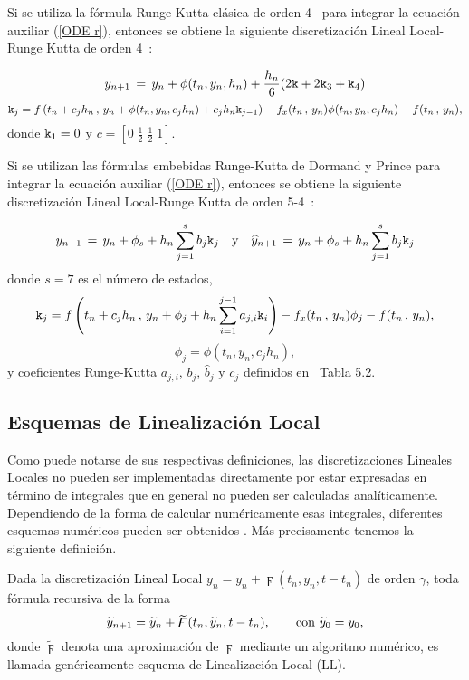 Si se utiliza la fórmula Runge-Kutta clásica de orden 4~\cite{hairer1993solving} para integrar la ecuación auxiliar (\ref{ODE r}), entonces se obtiene la siguiente discretización Lineal Local-Runge Kutta de orden 4~\cite{Jimenez13}:

\begin{equation}
    y_{n+1}\,=\,y_n+\phi(t_n,y_n,h_n)+\frac{h_n}{6}(2\mathtt{k}+2\mathtt{k}_3+\mathtt{k}_4)
    \label{LL-scheme-4}
    \end{equation}
    \[ \mathtt{k}_j = f\left( t_n+c_jh_n\, , \, y_n+\phi(t_n,y_n,c_jh_n)+c_jh_n\mathtt{k}_{j-1} \right)
- f_x(t_n\, , \, y_n)\phi(t_n,y_n,c_jh_n) - f(t_n\, ,\, y_n) ,\]
donde $\mathtt{k}_1=0$ y $c = \left[ 0 \; \frac{1}{2} \; \frac{1}{2} \; 1  \right]$.

Si se utilizan las fórmulas embebidas Runge-Kutta de Dormand y Prince para integrar la ecuación auxiliar (\ref{ODE r}), entonces se obtiene la siguiente discretización Lineal Local-Runge Kutta de orden 5-4~\cite{Jimenez14AMC}:

\begin{equation}
y_{n+1}\,=\,y_n+\phi_s+h_n \sum_{j=1}^{s}b_j \mathtt{k}_j \quad \text{y} \quad
\widehat{y}_{n+1}\,=\, y_n+\phi_s+h_n \sum_{j=1}^{s}b_j \mathtt{k}_j
\label{LLDP-scheme-dp}
\end{equation}
donde $s = 7$ es el número de estados,
\[ \mathtt{k}_j = f\left( t_n+c_jh_n\, , \, y_n+\phi_j+h_n \sum_{i=1}^{j-1}a_{j,i}\mathtt{k}_i \right)  
- f_x(t_n\, , \, y_n)\phi_j - f(t_n\, ,\, y_n),\]
\[ \phi _j = \phi \left( t_{n},y_{n},c_jh_{n}\right), \]
y coeficientes Runge-Kutta $a_{j,i}$, $b_j$, $\hat{b}_j$ y $c_j$ definidos en~\cite{hairer1993solving} Tabla 5.2.

\subsection{Esquemas de Linealización Local}

Como puede notarse de sus respectivas definiciones, las
discretizaciones Lineales Locales no pueden ser implementadas directamente por
estar expresadas en término de integrales que en general no pueden ser
calculadas analíticamente. Dependiendo de la forma de calcular  numéricamente esas integrales,
 diferentes esquemas numéricos pueden ser obtenidos \cite{Jimenez05AMC,Jimenez13}.
 Más precisamente tenemos la siguiente definición.
\begin{definition}
	\label{definition LLS} Dada la discretización Lineal Local 
	  $y_n=y_{n}+\digamma(t_{n},y_{n},t-t_{n})$
	 de orden $\gamma $, toda fórmula recursiva de la forma 
	\begin{equation*}
	 \widetilde{y}_{n+1}=\widetilde{y}_{n}+\widetilde{\digamma}(t_{n},\widetilde{y}_{n},t-t_{n})
	 , \text{ \ \ \ \
		\ con }\widetilde{y}_{0}=y_{0},
	\end{equation*}%
	donde $\widetilde{\digamma}$ denota una aproximación
	de $\digamma$ mediante un algoritmo numérico, es
	llamada genéricamente esquema de Linealización Local (LL).
\end{definition}


